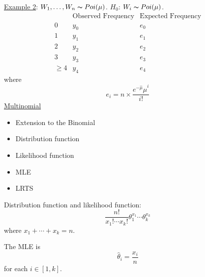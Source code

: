 \underline{Example 2}: $ W_1,\ldots ,W_n \thicksim Poi(\mu) $. $ H_0 $: $ W_i \thicksim Poi(\mu) $.
\[
    \begin{array}{c|c|c|}
                    & \text{Observed Frequency} & \text{Expected Frequency} \\
        \hline
        0           & y_0                       & e_0                       \\
        1           & y_1                       & e_1                       \\
        2           & y_2                       & e_2                       \\
        3           & y_3                       & e_3                       \\
        \geqslant 4 & y_4                       & e_4
    \end{array}
\]
where
\[ e_i=n\times \frac{e^{-\hat{\mu}}\hat{\mu}^i}{i!}  \]
\underline{Multinomial}
\begin{itemize}
    \item Extension to the Binomial
    \item Distribution function
    \item Likelihood function
    \item MLE
    \item LRTS
\end{itemize}
Distribution function and likelihood function:
\[ \frac{n!}{x_1!\cdots x_k!} \theta_1^{x_1}\cdots\theta_k^{x_k} \]
where $ x_1+\cdots+x_k=n $.

The MLE is
\[ \hat{\theta}_i=\frac{x_i}{n} \]
for each $ i\in[1,k] $.

